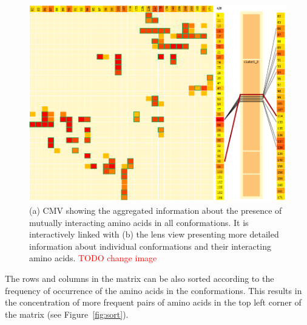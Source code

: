 \documentclass[journal]{vgtc}                %
\begin{document}
\begin{figure}[bt]
  \centering
  \includegraphics[width=1.0\columnwidth]{matrixlens.png}
  \caption{(a) CMV showing the aggregated information about the presence of mutually interacting amino acids in all conformations. It is interactively linked with (b) the lens view presenting more detailed information about individual conformations and their interacting amino acids. \textcolor{red}{TODO change image}}
  \label{fig:matrixlens}
\end{figure}

The rows and columns in the matrix can be also sorted according to the frequency of occurrence of the amino acids in the conformations. 
This results in the concentration of more frequent pairs of amino acids in the top left corner of the matrix (see Figure~\ref{fig:sort}).
\end{document}
